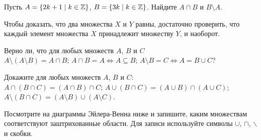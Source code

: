 \documentclass[a4paper,11pt]{article}
\begin{document}
Пусть $A=\{2k+1 \mid k\in\mathbb{Z}\}$,
$B=\{3k \mid k\in\mathbb{Z}\}$. Найдите $A\cap B$ и $B\setminus A$.





\noindent
{\small
Чтобы доказать, что два множества $X$ и $Y$ равны, достаточно проверить,
что каждый элемент множества $X$ принадлежит множеству $Y$, и наоборот.
}


Верно ли, что для любых множеств $A$, $B$ и $C$\\
 $A\setminus(A\setminus B) = A\cap B$;
 $A\cap B = A \Leftrightarrow A\subseteq B$;
 $A\setminus B = C \Leftrightarrow A=B\cup C$?




Докажите %
для любых множеств $A$, $B$ и $C$:\\
 $A\cap(B\cap C) = (A\cap B)\cap C$;
 $A\cup(B\cap C) = (A\cup B)\cap(A\cup C)$;
 $A\setminus(B\cap C) = (A\setminus B)\cup(A\setminus C)$.

 Посмотрите на диаграммы Эйлера-Венна ниже и запишите, каким множествам
соответствуют заштрихованные области. Для записи используйте
символы $\cup$, $\cap$, $\backslash$ и скобки.
\end{document}
